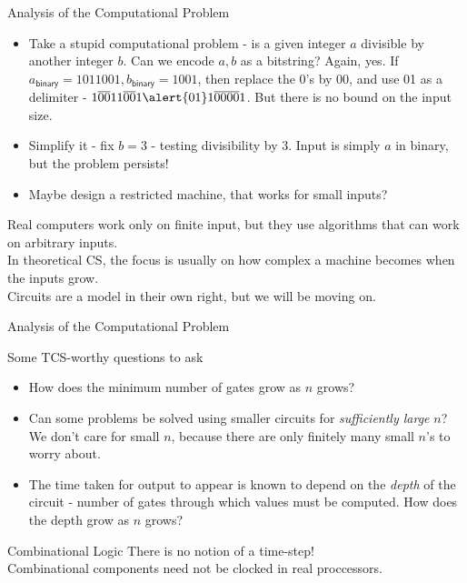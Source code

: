 \documentclass{beamer}
\begin{document}
\begin{frame}{Analysis of the Computational Problem}
\begin{itemize}
\item Take a stupid computational problem - is a given integer $a$ divisible by another integer $b$. Can we encode \(a, b\) as a bitstring? \pause Again, yes. If \(a_\mathsf{binary} = 1011001, b_\mathsf{binary} = 1001\), then replace the 0's by 00, and use 01 as a delimiter - \(1\overline{00}11\overline{00}1\alert{01}1\overline{00}\overline{00}1\). But there is no bound on the input size.
\pause
\item Simplify it - fix \(b=3\) - testing divisibility by 3. Input is simply $a$ in binary, but the problem persists! \pause
\item Maybe design a restricted machine, that works for small inputs?
\end{itemize}\pause
Real computers work only on finite input, but they use algorithms that can work on arbitrary inputs. \\
In theoretical CS, the focus is usually on how complex a machine becomes when the inputs grow. \pause \\
Circuits are a model in their own right, but we will be moving on.
\end{frame}
\begin{frame}{Analysis of the Computational Problem}
\begin{block}{Some TCS-worthy questions to ask}
    \begin{itemize}
        \item How does the minimum number of gates grow as $n$ grows?
        \item Can some problems be solved using smaller circuits for \emph{sufficiently large} $n$? We don't care for small $n$, because there are only finitely many small $n$'s to worry about.
        \item The time taken for output to appear is known to depend on the \emph{depth} of the circuit - number of gates through which values must be computed. How does the depth grow as $n$ grows?
    \end{itemize}
\end{block}
\pause
\begin{alertblock}{Combinational Logic}
There is no notion of a time-step!\\
Combinational components need not be clocked in real proccessors.
\end{alertblock}
\end{frame}
\end{document}
